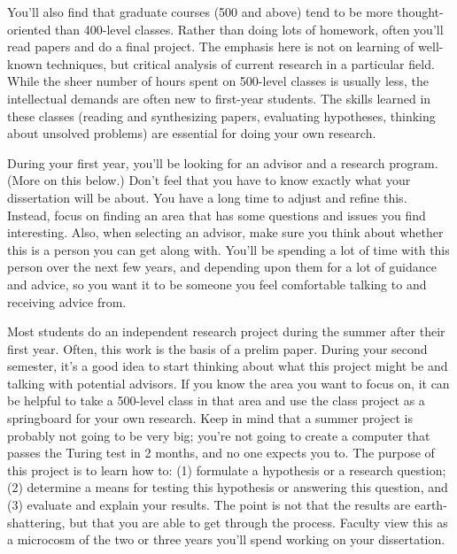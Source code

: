 \documentclass[11pt]{article}
\begin{document}
You’ll also find that graduate courses (500 and above) tend to be more
thought-oriented than 400-level classes.  Rather than doing lots of
homework, often you’ll read papers and do a final project.  The
emphasis here is not on learning of well-known techniques, but
critical analysis of current research in a particular field.  While
the sheer number of hours spent on 500-level classes is usually less,
the intellectual demands are often new to first-year students.  The
skills learned in these classes (reading and synthesizing papers,
evaluating hypotheses, thinking about unsolved problems) are essential
for doing your own research.

During your first year, you’ll be looking for an advisor and a
research program.  (More on this below.)  Don’t feel that you have to
know exactly what your dissertation will be about.  You have a long
time to adjust and refine this.  Instead, focus on finding an area
that has some questions and issues you find interesting.  Also, when
selecting an advisor, make sure you think about whether this is a
person you can get along with.  You’ll be spending a lot of time with
this person over the next few years, and depending upon them for a lot
of guidance and advice, so you want it to be someone you feel
comfortable talking to and receiving advice from.

Most students do an independent research project during the summer
after their first year. Often, this work is the basis of a prelim
paper.  During your second semester, it’s a good idea to start
thinking about what this project might be and talking with potential
advisors.  If you know the area you want to focus on, it can be
helpful to take a 500-level class in that area and use the class
project as a springboard for your own research.  Keep in mind that a
summer project is probably not going to be very big; you’re not going
to create a computer that passes the Turing test in 2 months, and no
one expects you to.  The purpose of this project is to learn how to:
(1) formulate a hypothesis or a research question; (2) determine a
means for testing this hypothesis or answering this question, and (3)
evaluate and explain your results.  The point is not that the results
are earth-shattering, but that you are able to get through the
process.  Faculty view this as a microcosm of the two or three years
you’ll spend working on your dissertation.
\end{document}
